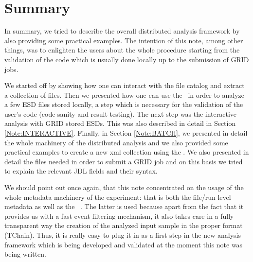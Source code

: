 \section{Summary}
\label{Note:SUMMARY}

In summary, we tried to describe the overall distributed analysis framework by also providing some practical examples. The intention of this note, among other things, was to enlighten the users about the whole procedure starting from the validation of the code which is usually done locally up to the submission of GRID jobs. 

We started off by showing how one can interact with the file catalog and extract a collection of files. Then we presented how one can use the \tag\ in order to analyze a few ESD files stored locally, a step which is necessary for the validation of the user's code (code sanity and result testing). The next step was the interactive analysis with GRID stored ESDs. This was also described in detail in Section \ref{Note:INTERACTIVE}. Finally, in Section \ref{Note:BATCH}, we presented in detail the whole machinery of the distributed analysis and we also provided some practical examples to create a new xml collection using the \tag. We also presented in detail the files needed in order to submit a GRID job and on this basis we tried to explain the relevant JDL fields and their syntax.

We should point out once again, that this note concentrated on the usage of the whole metadata machinery of the experiment: that is both the file/run level metadata \cite{Note:RefFileCatalogMetadataNote} as well as the \tag\ \cite{Note:RefEventTagNote}. The latter is used because apart from the fact that it provides us with a fast event filtering mechanism, it also takes care in a fully transparent way the creation of the analyzed input sample in the proper format ({\ttfamily TChain}). Thus, it is really easy to plug it in as a first step in the new analysis framework \cite{Note:RefAlienTutorial,Note:RefAnalysisFramework} which is being developed and validated at the moment this note was being written.